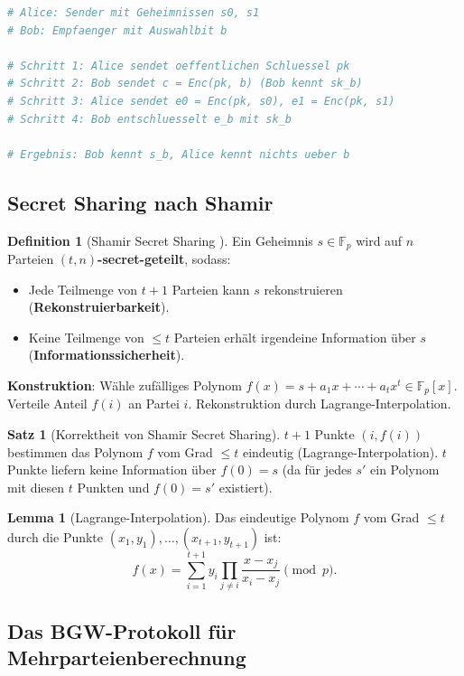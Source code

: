 ﻿\documentclass[a4paper,12pt]{scrreprt}
\theoremstyle{definition}
\newtheorem{definition}{Definition}[section]
\newtheorem{satz}{Satz}[section]
\newtheorem{lemma}{Lemma}[section]
\begin{document}
\begin{lstlisting}[language=Python, caption=OT-Protokoll nach Naor-Pinkas (vereinfacht)]
# Alice: Sender mit Geheimnissen s0, s1
# Bob: Empfaenger mit Auswahlbit b

# Schritt 1: Alice sendet oeffentlichen Schluessel pk
# Schritt 2: Bob sendet c = Enc(pk, b) (Bob kennt sk_b)
# Schritt 3: Alice sendet e0 = Enc(pk, s0), e1 = Enc(pk, s1)
# Schritt 4: Bob entschluesselt e_b mit sk_b

# Ergebnis: Bob kennt s_b, Alice kennt nichts ueber b
\end{lstlisting}

\subsection{Secret Sharing nach Shamir}

\begin{definition}[Shamir Secret Sharing \cite{Sha79}]
Ein Geheimnis $s \in \mathbb{F}_p$ wird auf $n$ Parteien \textbf{$(t,n)$-secret-geteilt}, sodass:
\begin{itemize}
    \item Jede Teilmenge von $t+1$ Parteien kann $s$ rekonstruieren (\textbf{Rekonstruierbarkeit}).
    \item Keine Teilmenge von $\leq t$ Parteien erhält irgendeine Information über $s$ (\textbf{Informations\-sicherheit}).
\end{itemize}
\textbf{Konstruktion}: Wähle zufälliges Polynom $f(x) = s + a_1 x + \cdots + a_t x^t \in \mathbb{F}_p[x]$. Verteile Anteil $f(i)$ an Partei $i$. Rekonstruktion durch Lagrange-Interpolation.
\end{definition}

\begin{satz}[Korrektheit von Shamir Secret Sharing]
$t+1$ Punkte $(i, f(i))$ bestimmen das Polynom $f$ vom Grad $\leq t$ eindeutig (Lagrange-Interpolation). $t$ Punkte liefern keine Information über $f(0) = s$ (da für jedes $s'$ ein Polynom mit diesen $t$ Punkten und $f(0) = s'$ existiert).
\end{satz}

\begin{lemma}[Lagrange-Interpolation]
Das eindeutige Polynom $f$ vom Grad $\leq t$ durch die Punkte $(x_1, y_1),\ldots,(x_{t+1}, y_{t+1})$ ist:
\[
f(x) = \sum_{i=1}^{t+1} y_i \prod_{j \neq i} \frac{x - x_j}{x_i - x_j} \pmod{p}.
\]
\end{lemma}

\subsection{Das BGW-Protokoll für Mehrparteienberechnung}
\end{document}
